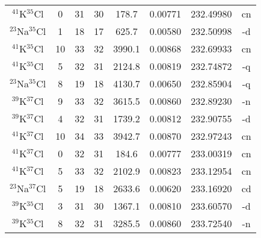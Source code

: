 \begin{table*}[htp]
\begin{tabular}{cccccccc}
$^{41}$K$^{35}$Cl & 0 & 31 & 30 & 178.7 & 0.00771 & 232.49980 & cn \\
$^{23}$Na$^{35}$Cl & 1 & 18 & 17 & 625.7 & 0.00580 & 232.50998 & -d \\
$^{41}$K$^{35}$Cl & 10 & 33 & 32 & 3990.1 & 0.00868 & 232.69933 & cn \\
$^{41}$K$^{35}$Cl & 5 & 32 & 31 & 2124.8 & 0.00819 & 232.74872 & -q \\
$^{23}$Na$^{35}$Cl & 8 & 19 & 18 & 4130.7 & 0.00650 & 232.85904 & -q \\
$^{39}$K$^{37}$Cl & 9 & 33 & 32 & 3615.5 & 0.00860 & 232.89230 & -n \\
$^{39}$K$^{37}$Cl & 4 & 32 & 31 & 1739.2 & 0.00812 & 232.90755 & -d \\
$^{41}$K$^{37}$Cl & 10 & 34 & 33 & 3942.7 & 0.00870 & 232.97243 & cn \\
$^{41}$K$^{37}$Cl & 0 & 32 & 31 & 184.6 & 0.00777 & 233.00319 & cn \\
$^{41}$K$^{37}$Cl & 5 & 33 & 32 & 2102.9 & 0.00823 & 233.12954 & cn \\
$^{23}$Na$^{37}$Cl & 5 & 19 & 18 & 2633.6 & 0.00620 & 233.16920 & cd \\
$^{39}$K$^{35}$Cl & 3 & 31 & 30 & 1367.1 & 0.00810 & 233.60570 & -d \\
$^{39}$K$^{35}$Cl & 8 & 32 & 31 & 3285.5 & 0.00860 & 233.72540 & -n \\
\hline
\end{tabular}

\par 
\end{table*}
